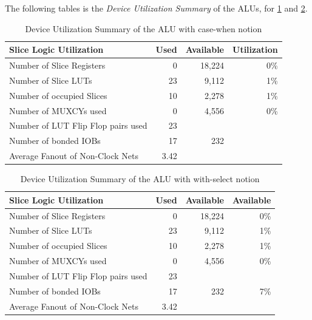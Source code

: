 \documentclass{article}
\begin{document}
    The following tables is the \textit{Device Utilization Summary} of the ALUs, for \ref{tab:rtl:cw} and \ref{tab:rtl:ws}.
    \begin{table}[h!]
        \centering
        \begin{tabular}{|l|r|r|r|}
            \hline Slice Logic Utilization & Used & Available & Utilization \\ 
            \hline Number of Slice Registers & 0
            & 18,224
            & 0\%
            \\ 
            \hline Number of Slice LUTs & 23
            & 9,112
            & 1\% \\ 
            \hline Number of occupied Slices & 10
            & 2,278 & 1\%
            \\ 
            \hline Number of MUXCYs used & 0 & 4,556 & 0\% \\
            \hline Number of LUT Flip Flop pairs used & 23
            &  &  \\ 
            \hline Number of bonded IOBs & 17
            & 232
            &  \\ 
            \hline Average Fanout of Non-Clock Nets & 3.42
            &  &  \\ 
            \hline 
        \end{tabular} 
        \caption{Device Utilization Summary of the ALU with case-when notion}
        \label{tab:rtl:cw}
    \end{table}
    \begin{table}[h!]
        \centering
        \begin{tabular}{|l|r|r|r|}
            \hline Slice Logic Utilization & Used & Available & Available \\ 
            \hline Number of Slice Registers & 0 & 18,224 & 0\% \\ 
            \hline Number of Slice LUTs & 23 & 9,112 & 1\% \\ 
            \hline Number of occupied Slices & 10 & 2,278 & 1\% \\ 
            \hline Number of MUXCYs used & 0 & 4,556 & 0\% \\ 
            \hline Number of LUT Flip Flop pairs used & 23 & & \\
            \hline Number of bonded IOBs & 17 & 232 & 7\% \\ 
            \hline Average Fanout of Non-Clock Nets & 3.42
            &  &  \\ 
            \hline 
        \end{tabular} 
        \caption{Device Utilization Summary of the ALU with with-select notion}
        \label{tab:rtl:ws}
    \end{table}
   
\end{document}
